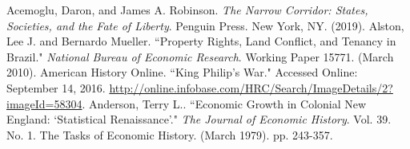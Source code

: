 \documentclass[11pt]{article}
\begin{document}
\begin{thebibliography}{1}

{} Acemoglu, Daron, and James A. Robinson. {\em The Narrow Corridor: States, Societies, and the Fate of Liberty}. Penguin Press. New York, NY. (2019).
\smallskip
{} Alston, Lee J. and Bernardo Mueller. ``Property Rights, Land Conflict, and Tenancy in Brazil."  {\em National Bureau of Economic Research}. Working Paper 15771. (March 2010).
\smallskip
{} American History Online. ``King Philip's War."  Accessed Online: September 14, 2016. \url{http://online.infobase.com/HRC/Search/ImageDetails/2?imageId=58304}.
\smallskip
{} Anderson, Terry L.. ``Economic Growth in Colonial New England: `Statistical Renaissance'."  {\em The Journal of Economic History}. Vol. 39. No. 1. The Tasks of Economic History. (March 1979). pp. 243-357.
\smallskip


\end{thebibliography}
\end{document}
